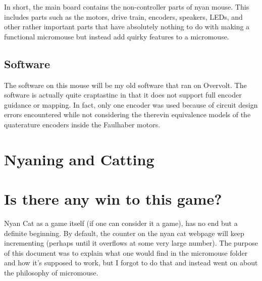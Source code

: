 \documentclass{article}
\begin{document}
In short, the main board contains the non-controller parts of nyan mouse.  This includes parts such as the motors, drive train, encoders, speakers, LEDs, and other rather important parts that have absolutely nothing to do with making a functional micromouse but instead add quirky features to a micromouse.

\subsection {Software}
The software on this mouse will be my old software that ran on Overvolt.
The software is actually quite craptastinc in that it does not support full encoder guidance or mapping.
In fact, only one encoder was used because of circuit design errors encountered while not considering the therevin equivalence models of the quaterature encoders inside the Faulhaber motors.

\section {Nyaning and Catting}

\section {Is there any win to this game?}
Nyan Cat as a game itself (if one can consider it a game), has no end but a definite beginning.  By default, the counter on the nyan cat webpage will keep incrementing (perhaps until it overflows at some very large number).  The purpose of this document was to explain what one would find in the micromouse folder and how it's supposed to work, but I forgot to do that and instead went on about the philosophy of micromouse.
\end{document}
